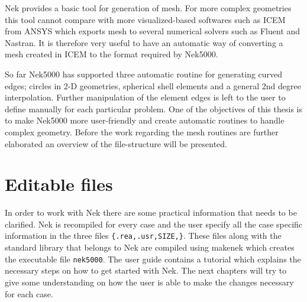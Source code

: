 
Nek provides a basic tool for generation of mesh. For more complex geometries this tool cannot compare with more visualized-based softwares 
such as ICEM from ANSYS which exports mesh to several numerical solvers such as Fluent and Nastran.
It is therefore very useful to have an automatic way of converting a mesh created in ICEM to the format required by Nek5000. 

So far Nek5000 has supported three automatic routine for generating curved edges;
circles in 2-D geometries, spherical shell elements and a general 2nd degree interpolation.
Further manipulation of the element edges is left to the user to define manually
for each particular problem. One of the objectives of this thesis is to make Nek5000 more
user-friendly and create automatic routines to handle complex geometry. Before the work regarding
the mesh routines are further elaborated an overview of the file-structure will be presented.

\section{Editable files}
In order to work with Nek there are some practical information that needs to be clarified.
Nek is recompiled for every case and the user specify all the case specific 
information in the three files 
\verb|{.rea,.usr,SIZE,}|. These files along with the standard library that belongs to Nek are 
compiled using makenek which creates the executable file \verb|nek5000|. 
The user guide \cite{Nek} contains a tutorial which explains the necessary 
steps on how to get started with Nek. The next chapters will try to give some understanding on 
how the user is able to make the changes necessary for each case.
%
